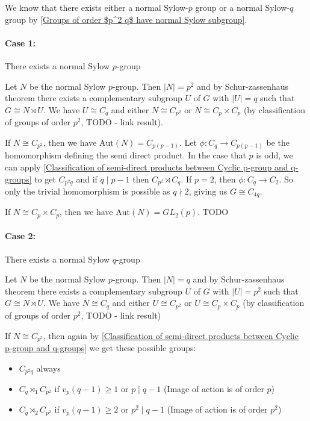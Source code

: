 \documentclass[a4paper,11pt, titlepage]{article}
\theoremstyle{remark}
\begin{document}
We know that there exists either a normal Sylow-$p$ group or a normal Sylow-$q$ group by \ref{Groups of order $p^2 q$ have normal Sylow subgroup}.

\paragraph{Case 1:} There exists a normal Sylow $p$-group

Let $N$ be the normal Sylow $p$-group. Then $|N| = p^2$ and by Schur-zassenhaus theorem there exists a complementary subgroup $U$ of $G$ with $|U| = q$ such that $G \cong N \rtimes U$. We have $U \cong C_q$ and either $N \cong C_{p^2}$ or $N \cong C_p \times C_p$ (by classification of groups of order $p^2$, TODO - link result).

If $N \cong C_{p^2}$, then we have $\text{Aut}(N) = C_{p(p-1)}$. Let $\phi : C_q \rightarrow C_{p(p-1)}$ be the homomorphism defining the semi direct product. In the case that $p$ is odd, we can apply \ref{Classification of semi-direct products between Cyclic p-group and q-groups} to get $C_{p^2 q}$ and if $q \mid p - 1$ then $C_{p^2} \rtimes C_q$. If $p = 2$, then $\phi : C_q \rightarrow C_2$. So only the trivial homomorphism is possible as $q \nmid 2$, giving us $G \cong C_{4q}$.

If $N \cong C_p \times C_p$, then we have $\text{Aut}(N) = GL_2(p)$. TODO

\paragraph{Case 2:} There exists a normal Sylow $q$-group

Let $N$ be the normal Sylow $p$-group. Then $|N| = q$ and by Schur-zassenhaus theorem there exists a complementary subgroup $U$ of $G$ with $|U| = p^2$ such that $G \cong N \rtimes U$. We have $N \cong C_q$ and either $U \cong C_{p^2}$ or $U \cong C_p \times C_p$ (by classification of groups of order $p^2$, TODO - link result)

If $N \cong C_{p^2}$, then again by \ref{Classification of semi-direct products between Cyclic p-group and q-groups} we get these possible groups:
\begin{itemize}
    \item $C_{p^2q}$ always
    \item $C_q \rtimes_1 C_{p^2}$ if $v_p(q - 1) \geq 1$ or $p 
    \mid q - 1$ (Image of action is of order $p$)
    \item $C_q \rtimes_2 C_{p^2}$ if $v_p(q - 1) \geq 2$ or $p^2 \mid q - 1$ (Image of action is of order $p^2$)
\end{itemize}
\end{document}
